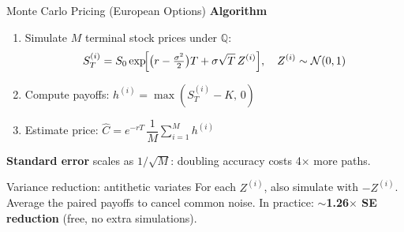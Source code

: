 \documentclass[aspectratio=169,10pt]{beamer}
\newcommand{\highlight}[1]{\textcolor{amred}{\textbf{#1}}}
\newcommand{\Q}{\mathbb{Q}}
\begin{document}
\begin{frame}{Monte Carlo Pricing (European Options)}
  \textbf{Algorithm}
  \begin{enumerate}
    \item Simulate $M$ terminal stock prices under $\Q$:
          \[
            S_T^{(i)} = S_0 \exp\!\Bigl[\bigl(r - \tfrac{\sigma^2}{2}\bigr)T
                         + \sigma\sqrt{T}\,Z^{(i)}\Bigr],\quad Z^{(i)}\sim\mathcal{N}(0,1)
          \]
    \item Compute payoffs: $h^{(i)} = \max(S_T^{(i)} - K,\,0)$
    \item Estimate price: $\hat{C} = e^{-rT}\,\dfrac{1}{M}\sum_{i=1}^{M} h^{(i)}$
  \end{enumerate}

  \bigskip
  \textbf{Standard error} scales as $1/\sqrt{M}$: doubling accuracy costs 4$\times$ more paths.

  \begin{block}{Variance reduction: antithetic variates}
    For each $Z^{(i)}$, also simulate with $-Z^{(i)}$.  Average the paired payoffs
    to cancel common noise.  In practice: \highlight{$\sim$1.26$\times$ SE reduction}
    (free, no extra simulations).
  \end{block}
\end{frame}
\end{document}
